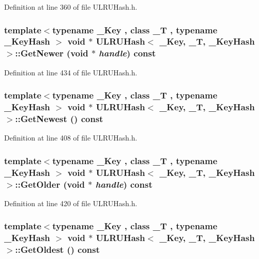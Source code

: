 Definition at line 360 of file ULRUHash.h.\hypertarget{class_u_l_r_u_hash_87200ea360ecf08acd16f65883d7e3ae}{
\subsubsection[{GetNewer}]{\setlength{\rightskip}{0pt plus 5cm}template$<$typename \_\-Key , class \_\-T , typename \_\-KeyHash $>$ void $\ast$ {\bf ULRUHash}$<$ \_\-Key, \_\-T, \_\-KeyHash $>$::GetNewer (void $\ast$ {\em handle}) const}}
\label{class_u_l_r_u_hash_87200ea360ecf08acd16f65883d7e3ae}




Definition at line 434 of file ULRUHash.h.\hypertarget{class_u_l_r_u_hash_059223a11ed06800c1a634e59197d8d7}{
\subsubsection[{GetNewest}]{\setlength{\rightskip}{0pt plus 5cm}template$<$typename \_\-Key , class \_\-T , typename \_\-KeyHash $>$ void $\ast$ {\bf ULRUHash}$<$ \_\-Key, \_\-T, \_\-KeyHash $>$::GetNewest () const}}
\label{class_u_l_r_u_hash_059223a11ed06800c1a634e59197d8d7}




Definition at line 408 of file ULRUHash.h.\hypertarget{class_u_l_r_u_hash_b4b559b779b8c5872352e98b8ed3ed08}{
\subsubsection[{GetOlder}]{\setlength{\rightskip}{0pt plus 5cm}template$<$typename \_\-Key , class \_\-T , typename \_\-KeyHash $>$ void $\ast$ {\bf ULRUHash}$<$ \_\-Key, \_\-T, \_\-KeyHash $>$::GetOlder (void $\ast$ {\em handle}) const}}
\label{class_u_l_r_u_hash_b4b559b779b8c5872352e98b8ed3ed08}




Definition at line 420 of file ULRUHash.h.\hypertarget{class_u_l_r_u_hash_8c74e3de413f887f50782f56807261e5}{
\subsubsection[{GetOldest}]{\setlength{\rightskip}{0pt plus 5cm}template$<$typename \_\-Key , class \_\-T , typename \_\-KeyHash $>$ void $\ast$ {\bf ULRUHash}$<$ \_\-Key, \_\-T, \_\-KeyHash $>$::GetOldest () const}}
\label{class_u_l_r_u_hash_8c74e3de413f887f50782f56807261e5}




